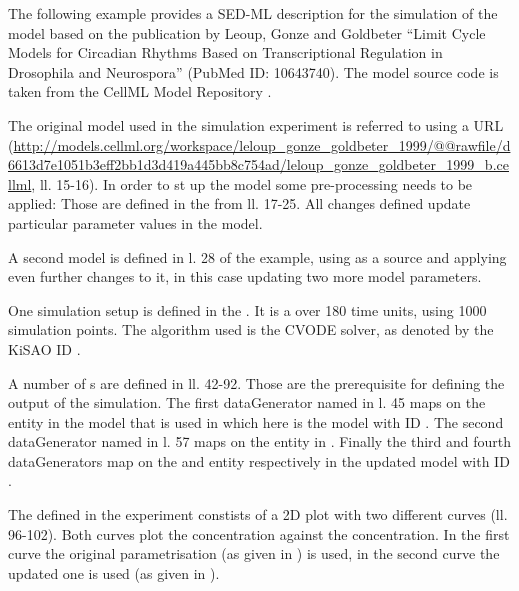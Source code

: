 The following example provides a SED-ML description for the simulation of the model based on the publication by Leoup, Gonze and Goldbeter ``Limit Cycle Models for Circadian Rhythms Based on Transcriptional Regulation in Drosophila and Neurospora'' (PubMed ID: 10643740).
The model source code is taken from the CellML Model Repository \citep{LLH+08}. 

The original model used in the simulation experiment is referred to using a URL (\url{http://models.cellml.org/workspace/leloup_gonze_goldbeter_1999/@@rawfile/d6613d7e1051b3eff2bb1d3d419a445bb8c754ad/leloup_gonze_goldbeter_1999_b.cellml}, ll. 15-16).
In order to st up the model some pre-processing needs to be applied: Those are defined in the  from ll. 17-25. All changes defined update particular parameter values in the model.

A second model is defined in l. 28 of the example, using  as a source and applying even further changes to it, in this case updating two more model parameters.

One simulation setup is defined in the . It is a  over 180 time units, using 1000 simulation points. The algorithm used is the CVODE solver, as denoted by the KiSAO ID .

A number of s are defined in ll. 42-92. Those are the prerequisite for defining the output of the simulation. The first dataGenerator named  in l. 45 maps on the  entity in the model that is used in  which here is the model with ID . The second dataGenerator named  in l. 57 maps on the  entity in . Finally  the third and fourth dataGenerators map on the  and  entity respectively in the updated model with ID .

The  defined in the experiment constists of a 2D plot with two different curves (ll. 96-102). Both curves plot the  concentration against the  concentration. In the first curve the original parametrisation (as given in ) is used, in the second curve the updated one is used (as given in ).


